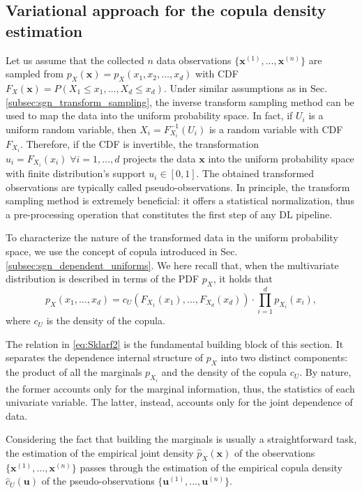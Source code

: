 \subsection{Variational approach for the copula density estimation}
\label{subsec:codine}
Let us assume that the collected $n$ data observations $\{\mathbf{x}^{(1)},\dots,\mathbf{x}^{(n)}\}$ are sampled from $p_{X}(\mathbf{x}) = p_{X}(x_1, x_2, \dots, x_d)$ with CDF $F_{X}(\mathbf{x}) = P(X_1\leq x_1, \dots, X_d \leq x_d)$.
Under similar assumptions as in Sec. \ref{subsec:sgn_transform_sampling}, 
the inverse transform sampling method can be used to map the data into the uniform probability space. In fact, if $U_i$ is a uniform random variable, then
$X_i = F^{-1}_{X_i}(U_i)$ is a random variable with CDF $F_{X_i}$.
Therefore, if the CDF is invertible, the transformation $u_i = F_{X_i}(x_i) \; \forall i=1,\dots,d$ projects the data $\mathbf{x}$ into the uniform probability space with finite distribution's support $u_i \in [0,1]$. The obtained transformed observations are typically called pseudo-observations.
In principle, the transform sampling method is extremely beneficial: it offers a statistical normalization, thus a pre-processing operation that constitutes the first step of any DL pipeline.

To characterize the nature of the transformed data in the uniform probability space, we use the concept of copula introduced in Sec. \ref{subsec:sgn_dependent_uniforms}.
We here recall that, when the multivariate distribution is described in terms of the PDF $p_{X}$, it holds that
\begin{equation}
\label{eq:Sklarf2}
p_{X}(x_1,\dots,x_d) = c_{U}(F_{X_1}(x_1),\dots,F_{X_d}(x_d))\cdot \prod_{i=1}^{d}{p_{X_i}(x_i)},
\end{equation}
where $c_{U}$ is the density of the copula.

The relation in \eqref{eq:Sklarf2} is the fundamental building block of this section. It separates the dependence internal structure of $p_{X}$ into two distinct components: the product of all the marginals $p_{X_i}$ and the density of the copula $c_{U}$. By nature, the former accounts only for the marginal information, thus, the statistics of each univariate variable. The latter, instead, accounts only for the joint dependence of data.

Considering the fact that building the marginals is usually a straightforward task, the estimation of the empirical joint density $\hat{p}_{X}(\mathbf{x})$ of the observations $\{\mathbf{x}^{(1)},\dots,\mathbf{x}^{(n)}\}$ passes through the estimation of the empirical copula density $\hat{c}_{U}(\mathbf{u})$ of the pseudo-observations $\{\mathbf{u}^{(1)},\dots,\mathbf{u}^{(n)}\}$. 


